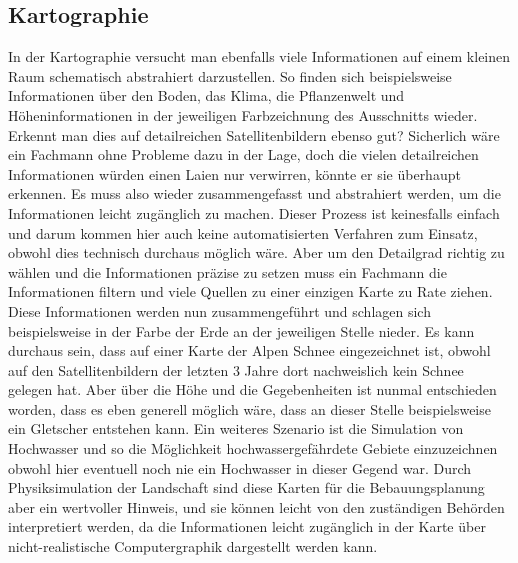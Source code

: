 \subsection{Kartographie}
In der Kartographie versucht man ebenfalls viele Informationen auf einem 
kleinen Raum schematisch abstrahiert darzustellen. So finden sich 
beispielsweise Informationen über den Boden, das Klima, die Pflanzenwelt und 
Höheninformationen in der jeweiligen Farbzeichnung des Ausschnitts wieder. 
Erkennt man dies auf detailreichen Satellitenbildern ebenso gut? Sicherlich 
wäre ein Fachmann ohne Probleme dazu in der Lage, doch die vielen detailreichen 
Informationen würden einen Laien nur verwirren, könnte er sie überhaupt 
erkennen. Es muss also wieder zusammengefasst und abstrahiert werden, um die 
Informationen leicht zugänglich zu machen. Dieser Prozess ist keinesfalls 
einfach und darum kommen hier auch keine automatisierten Verfahren zum Einsatz, 
obwohl dies technisch durchaus möglich wäre. Aber um den Detailgrad richtig zu 
wählen und die Informationen präzise zu setzen muss ein Fachmann die 
Informationen filtern und viele Quellen zu einer einzigen Karte zu Rate ziehen. 
Diese Informationen werden nun zusammengeführt und schlagen sich beispielsweise 
in der Farbe der Erde an der jeweiligen Stelle nieder. Es kann durchaus sein, 
dass auf einer Karte der Alpen Schnee eingezeichnet ist, obwohl auf den 
Satellitenbildern der letzten 3 Jahre dort nachweislich kein Schnee gelegen 
hat. Aber über die Höhe und die Gegebenheiten ist nunmal entschieden worden, 
dass es eben generell möglich wäre, dass an dieser Stelle beispielsweise ein 
Gletscher entstehen kann. Ein weiteres Szenario ist die Simulation von 
Hochwasser und so die Möglichkeit hochwassergefährdete Gebiete einzuzeichnen 
obwohl hier eventuell noch nie ein Hochwasser in dieser Gegend war. Durch 
Physiksimulation der Landschaft sind diese Karten für die Bebauungsplanung aber 
ein wertvoller Hinweis, und sie können leicht von den zuständigen Behörden 
interpretiert werden, da die Informationen leicht zugänglich in der Karte über 
nicht-realistische Computergraphik dargestellt werden kann.